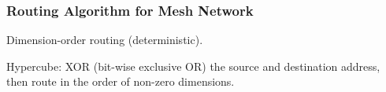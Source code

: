 \documentclass{beamer}
\newcommand{\emp}[1]{\textcolor{DikuRed}{ #1}}
\begin{document}
\begin{frame}[fragile,t]
\frametitle{Routing Algorithm for Mesh Network}

Dimension-order routing (deterministic). 
\vspace{-3ex}

\vspace{-3ex}
\emp{Hypercube:} XOR (bit-wise exclusive OR) the source and destination address,
            then route in the order of non-zero dimensions. 

\end{frame}
\end{document}
